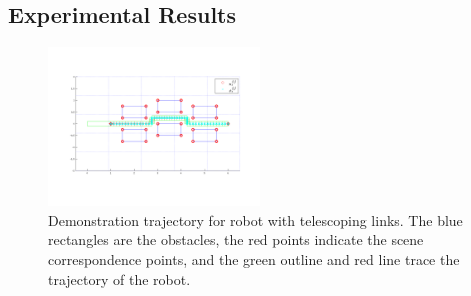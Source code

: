 \documentclass{article}
\begin{document}
\subsection*{Experimental Results}

\begin{figure}[h!]
\centering
\includegraphics[width=0.5\textwidth]{scopey_demo}
\vspace{-1cm}
\caption{Demonstration trajectory for robot with telescoping links. The blue rectangles are the obstacles, the red points indicate the scene correspondence points, and the green outline and red line trace the trajectory of the robot.}
\label{fig:scopey_demo}
\end{figure}
\end{document}
